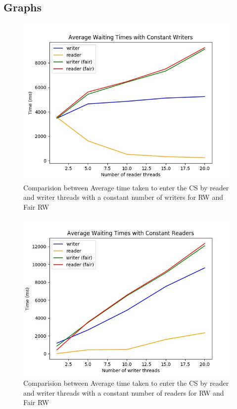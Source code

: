 \documentclass[12pt]{article}
\begin{document}
\subsection{Graphs}
\begin{figure}[ht!]
\includegraphics[width=150mm]{1st.jpg}
\caption{Comparision between Average
time taken to enter the CS by reader and writer threads with a constant number of writers for RW and Fair RW}
\end{figure}

\newpage

\begin{figure}[ht!]
\includegraphics[width=150mm]{2nd.jpg}
\caption{Comparision between Average
time taken to enter the CS by reader and writer threads with a constant number of readers for RW and Fair RW}
\end{figure}
\end{document}
